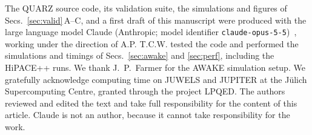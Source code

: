 \documentclass[aps,prab,reprint,floatfix,superscriptaddress,amsmath,amssymb]{revtex4-2}
\begin{document}
\begin{acknowledgments}
The QUARZ source code, its validation suite, the simulations and figures of Secs.~\ref{sec:valid}\,A--C, and a first draft of this manuscript were produced with the large language model Claude (Anthropic; model identifier \texttt{claude-opus-5-5})~\cite{Claude}, working under the direction of A.P. T.C.W. tested the code and performed the simulations and timings of Secs.~\ref{sec:awake} and \ref{sec:perf}, including the HiPACE++ runs. We thank J.~P.~Farmer for the AWAKE simulation setup. We gratefully acknowledge computing time on JUWELS and JUPITER at the J\"ulich Supercomputing Centre, granted through the project LPQED. The authors reviewed and edited the text and take full responsibility for the content of this article. Claude is not an author, because it cannot take responsibility for the work.
\end{acknowledgments}
\end{document}
